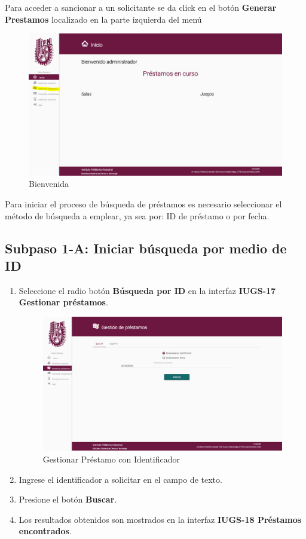 Para acceder a sancionar a un solicitante se da click en el botón
	 \textbf{Generar Prestamos} localizado en la parte izquierda del menú
	
	\begin{figure}[hbtp]

	\includegraphics[scale=0.3]{images/Interfaz/IUGS07_bienvenida.PNG}
	\caption{Bienvenida}
	\end{figure}
Para iniciar el proceso de búsqueda de préstamos es necesario seleccionar el método de 
búsqueda a emplear, ya sea por: ID de préstamo o por fecha.

\subsection{Subpaso 1-A: Iniciar búsqueda por medio de ID}
\begin{enumerate}
	\item Seleccione el radio botón \textbf{Búsqueda por ID} en la interfaz
		\textbf{IUGS-17 Gestionar préstamos}.
		\begin{figure}[hbtp]
	\includegraphics[scale=0.3]{images/Interfaz/IUGS07_gestionarPrestamoID.PNG}
	\caption{Gestionar Préstamo con Identificador}
	\end{figure}
	\item Ingrese el identificador a solicitar en el campo de texto.
	\item Presione el botón \textbf{Buscar}.
	
	
	\item Los resultados obtenidos son mostrados en la interfaz \textbf{IUGS-18 Préstamos encontrados}.
\end{enumerate}

